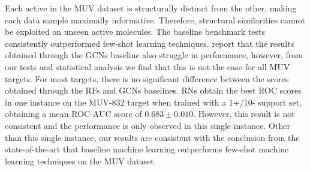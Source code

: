\documentclass[journal=acscii,manuscript=article]{achemso}
\begin{document}
Each active in the MUV dataset is structurally distinct from the other, making each data sample maximally informative. Therefore, structural similarities cannot be exploited on unseen active molecules. The baseline benchmark tests consistently outperformed few-shot learning techniques. \citet{altae2017low} report that the results obtained through the GCNs baseline also struggle in performance, however, from our tests and statistical analysis we find that this is not the case for all MUV targets. For most targets, there is no significant difference between the scores obtained through the RFs and GCNs baselines. RNs obtain the best ROC scores in one instance on the MUV-832 target when trained with a 1+/10- support set, obtaining a mean ROC-AUC score of $0.683 \pm 0.010$. However, this result is not consistent and the performance is only observed in this single instance. Other than this single instance, our results are consistent with the conclusion from the state-of-the-art that baseline machine learning outperforms few-shot machine learning techniques on the MUV dataset.
\end{document}

